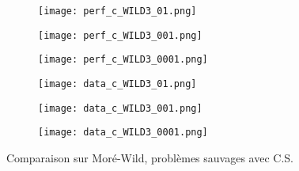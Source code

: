 \documentclass[letterpaper]{scrartcl}
\begin{document}
				\begin{figure}[!htb] %
			\begin{subfigure}{0.48\textwidth}
				\texttt{[image: perf\_c\_WILD3\_01.png]}
			\end{subfigure}\hspace*{\fill}
			\begin{subfigure}{0.48\textwidth}
				\texttt{[image: perf\_c\_WILD3\_001.png]}
			\end{subfigure}
			\medskip
			\begin{subfigure}{0.48\textwidth}
				\texttt{[image: perf\_c\_WILD3\_0001.png]}
			\end{subfigure}\hspace*{\fill}
			\begin{subfigure}{0.48\textwidth}
				\texttt{[image: data\_c\_WILD3\_01.png]}
			\end{subfigure}
			\medskip
			\begin{subfigure}{0.48\textwidth}
				\texttt{[image: data\_c\_WILD3\_001.png]}
			\end{subfigure}\hspace*{\fill}
			\begin{subfigure}{0.48\textwidth}
				\texttt{[image: data\_c\_WILD3\_0001.png]}
			\end{subfigure}
			\caption{Comparaison sur Moré-Wild, problèmes sauvages avec C.S.} \label{fig:4}
		\end{figure}
		\clearpage
\end{document}
